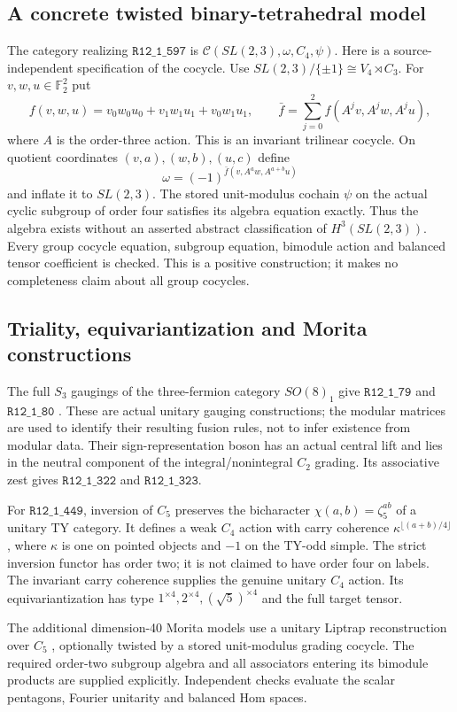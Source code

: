 \documentclass[11pt]{article}
\newcommand{\ring}[1]{\texttt{R12\_1\_#1}}
\begin{document}
\subsection*{A concrete twisted binary-tetrahedral model}
The category realizing $\ring{597}$ is $\mathcal C(SL(2,3),\omega,C_4,\psi)$.
Here is a source-independent specification of the cocycle. Use
$SL(2,3)/\{\pm1\}\cong V_4\rtimes C_3$. For $v,w,u\in\mathbb F_2^2$ put
\[
 f(v,w,u)=v_0w_0u_0+v_1w_1u_1+v_0w_1u_1,
 \qquad \bar f=\sum_{j=0}^2 f(A^jv,A^jw,A^ju),
\]
where $A$ is the order-three action. This is an invariant trilinear cocycle.
On quotient coordinates $(v,a),(w,b),(u,c)$ define
\[
 \omega=(-1)^{\bar f(v,A^a w,A^{a+b}u)}
\]
and inflate it to $SL(2,3)$. The stored unit-modulus cochain $\psi$ on the actual
cyclic subgroup of order four satisfies its algebra equation exactly. Thus the
algebra exists without an asserted abstract classification of $H^3(SL(2,3))$.
Every group cocycle equation, subgroup equation, bimodule action and balanced
tensor coefficient is checked. This is a positive construction; it makes no
completeness claim about all group cocycles.

\subsection*{Triality, equivariantization and Morita constructions}
The full $S_3$ gaugings of the three-fermion category $SO(8)_1$ give
$\ring{79}$ and $\ring{80}$ \cite[Section 6.2]{CGPW}\cite[Section VI.D]{THF}.
These are actual unitary gauging constructions; the modular matrices are used
to identify their resulting fusion rules, not to infer existence from modular data.
Their sign-representation boson has an actual central lift and lies in the neutral
component of the integral/nonintegral $C_2$ grading. Its associative zest gives
$\ring{322}$ and $\ring{323}$.

For $\ring{449}$, inversion of $C_5$ preserves the bicharacter
$\chi(a,b)=\zeta_5^{ab}$ of a unitary TY category. It defines a weak $C_4$ action
with carry coherence $\kappa^{\lfloor(a+b)/4\rfloor}$, where $\kappa$ is one on
pointed objects and $-1$ on the TY-odd simple. The strict inversion functor has
order two; it is not claimed to have order four on labels. The invariant carry
coherence supplies the genuine unitary $C_4$ action. Its equivariantization has
type $1^{\times4},2^{\times4},(\sqrt5)^{\times4}$ and the full target tensor.

The additional dimension-40 Morita models use a unitary Liptrap reconstruction
over $C_5$ \cite[Theorem 4 and Lemma 5.4]{Liptrap}, optionally twisted by a stored
unit-modulus grading cocycle. The required order-two subgroup algebra and all
associators entering its bimodule products are supplied explicitly. Independent
checks evaluate the scalar pentagons, Fourier unitarity and balanced Hom spaces.
\end{document}
